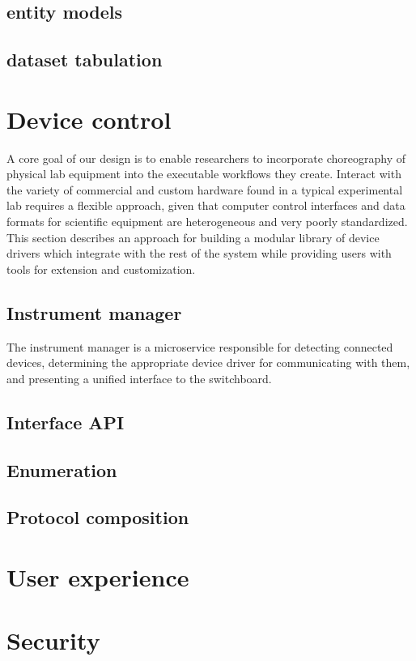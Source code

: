 \documentclass[../thesis]{subfiles}
\begin{document}
\subsection{entity models}
\subsection{dataset tabulation}



\section{Device control}
A core goal of our design is to enable researchers to incorporate
choreography of physical lab equipment into the executable workflows
they create. Interact with the variety of commercial and custom
hardware found in a typical experimental lab requires a flexible
approach, given that computer control interfaces and data formats for
scientific equipment are heterogeneous and very poorly
standardized. This section describes an approach for building a
modular library of device drivers which integrate with the rest of the
system while providing users with tools for extension and
customization.

\subsection{Instrument manager}
The instrument manager is a microservice responsible for detecting
connected devices, determining the appropriate device driver for
communicating with them, and presenting a unified interface to the
switchboard.

\subsection{Interface API}

\subsection{Enumeration}

\subsection{Protocol composition}



\section{User experience}



\section{Security}
\end{document}
